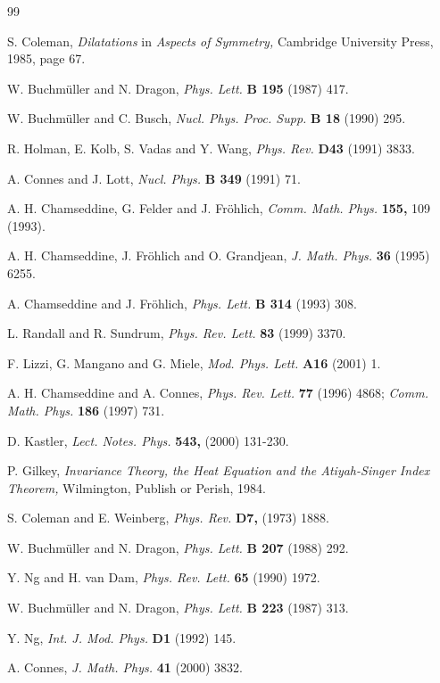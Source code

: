 \documentclass[12pt]{article}%
\begin{document}
\begin{thebibliography}{99}                                                                                               %


S. Coleman, \textit{Dilatations }in \textit{Aspects of
Symmetry,} Cambridge University Press, 1985, page 67.

W. Buchm\"{u}ller and N. Dragon, \textit{Phys. Lett. }\textbf{B
195 }(1987) 417.

W. Buchm\"{u}ller and C. Busch, \textit{Nucl. Phys. Proc. Supp.
}\textbf{B 18 }(1990) 295.

R. Holman, E. Kolb, S. Vadas and Y. Wang, \textit{Phys. Rev.
}\textbf{D43 }(1991) 3833.

A. Connes and J. Lott, \textit{Nucl. Phys. }\textbf{B 349 }(1991) 71.

A. H. Chamseddine, G. Felder and J. Fr\"{o}hlich, \textit{Comm.
Math. Phys. }\textbf{155, }109 (1993).

A. H. Chamseddine, J. Fr\"{o}hlich and O. Grandjean, \textit{J.
Math. Phys. }\textbf{36 }(1995) 6255.

A. Chamseddine and J. Fr\"{o}hlich, \textit{Phys. Lett.
}\textbf{B 314 }(1993) 308.

L. Randall and R. Sundrum, \textit{Phys. Rev. Lett. }\textbf{83
}(1999) 3370.

F. Lizzi, G. Mangano and G. Miele, \textit{Mod. Phys. Lett.
}\textbf{A16 }(2001) 1.

A. H. Chamseddine and A. Connes, \textit{Phys. Rev. Lett.
}\textbf{77 }(1996) 4868; \textit{Comm. Math. Phys. }\textbf{186 }(1997) 731.

D. Kastler, \textit{Lect. Notes. Phys. }\textbf{543, }(2000) 131-230.

P. Gilkey, \textit{Invariance Theory, the Heat Equation and
the Atiyah-Singer Index Theorem, } Wilmington, Publish or Perish, 1984.

S. Coleman and E. Weinberg, \textit{Phys. Rev. }\textbf{D7,
}(1973) 1888.

W. Buchm\"{u}ller and N. Dragon, \textit{Phys. Lett. }\textbf{B
207 }(1988) 292.

Y. Ng and H. van Dam, \textit{Phys. Rev. Lett. }\textbf{65
}(1990) 1972.

W. Buchm\"{u}ller and N. Dragon, \textit{Phys. Lett.
}\textbf{B 223 }(1987) 313.

Y. Ng, \textit{Int. J. Mod. Phys. }\textbf{D1 }(1992) 145.

A. Connes, \textit{J. Math. Phys. }\textbf{41 }(2000) 3832.
\end{thebibliography}
\end{document}
